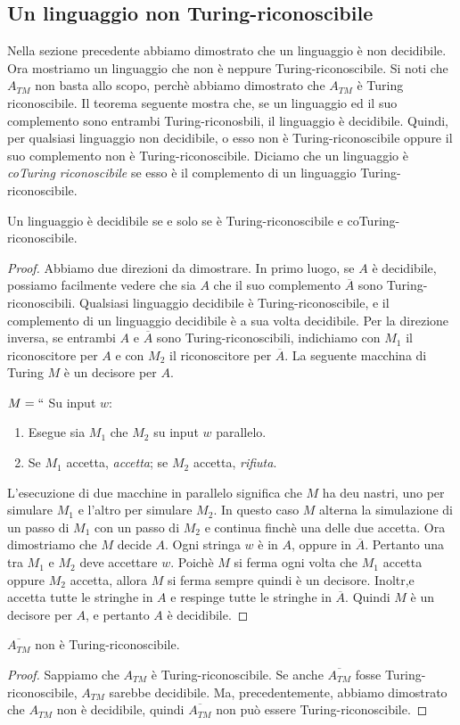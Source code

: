 \documentclass[12pt]{report}
\newcounter{theorem}
\newcounter{corollary}
\begin{document}
\subsection{Un linguaggio non Turing-riconoscibile}
Nella sezione precedente abbiamo dimostrato che un linguaggio è non decidibile. Ora mostriamo un linguaggio che non è neppure Turing-riconoscibile. Si noti che $A_{TM}$ non basta allo scopo, perchè abbiamo dimostrato che $A_{TM}$ è Turing riconoscibile. Il teorema seguente mostra che, se un linguaggio ed il suo complemento sono entrambi Turing-riconosbili, il linguaggio è decidibile. Quindi, per qualsiasi linguaggio non decidibile, o esso non è Turing-riconoscibile oppure il suo complemento non è Turing-riconoscibile. Diciamo che un linguaggio è \textit{coTuring riconoscibile} se esso è il complemento di un linguaggio Turing-riconoscibile.
\begin{theorem}{}{}
	Un linguaggio è decidibile se e solo se è Turing-riconoscibile e coTuring-riconoscibile.
\end{theorem}
\begin{proof}
	Abbiamo due direzioni da dimostrare. In primo luogo, se $A$ è decidibile, possiamo facilmente vedere che sia $A$ che il suo complemento $\overline{A}$ sono Turing-riconoscibili. Qualsiasi linguaggio decidibile è Turing-riconoscibile, e il complemento di un linguaggio decidibile è a sua volta decidibile. Per la direzione inversa, se entrambi $A$ e $\overline{A}$ sono Turing-riconoscibili, indichiamo con $M_1$ il riconoscitore per $A$ e con $M_2$ il riconoscitore per $\overline{A}$. La seguente macchina di Turing $M$ è un decisore per $A$.

	$M = ``$ Su input $w$:
	\begin{enumerate}
		\item Esegue sia $M_1$ che $M_2$ su input $w$ parallelo.
		\item Se $M_1$ accetta, \textit{accetta}; se $M_2$ accetta, \textit{rifiuta}.
	\end{enumerate}
	L'esecuzione di due macchine in parallelo significa che $M$ ha deu nastri, uno per simulare $M_1$ e l'altro per simulare $M_2$. In questo caso $M$ alterna la simulazione di un passo di $M_1$ con un passo di $M_2$ e continua finchè una delle due accetta. Ora dimostriamo che $M$ decide $A$. Ogni stringa $w$ è in $A$, oppure in $\overline{A}$. Pertanto una tra $M_1$ e $M_2$ deve accettare $w$. Poichè $M$ si ferma ogni volta che $M_1$ accetta oppure $M_2$ accetta, allora $M$ si ferma sempre quindi è un decisore. Inoltr,e accetta tutte le stringhe in $A$ e respinge tutte le stringhe in $\overline{A}$. Quindi $M$ è un decisore per $A$, e pertanto $A$ è decidibile.
\end{proof}
\begin{corollary}{}{}
$\overline{A_{TM}}$ non è Turing-riconoscibile.
\end{corollary}
\begin{proof} Sappiamo che $A_{TM}$ è Turing-riconoscibile. Se anche $\overline{A_{TM}}$ fosse Turing-riconoscibile, $A_{TM}$ sarebbe decidibile. Ma, precedentemente, abbiamo dimostrato che $A_{TM}$ non è decidibile, quindi $\overline{A_{TM}}$ non può essere Turing-riconoscibile.
\end{proof}
\end{document}
